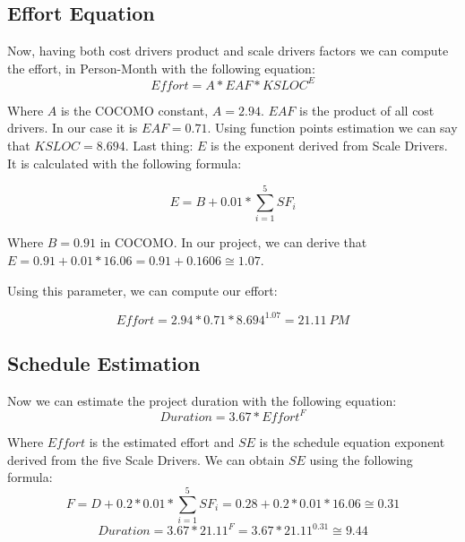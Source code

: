 \pagebreak
\subsection{Effort Equation} %
\label{sub:effort_equation}

Now, having both cost drivers product and scale drivers factors we can compute
the effort, in Person-Month with the following equation:
$$ Effort = A * EAF * KSLOC^E $$

Where $A$ is the COCOMO constant, $ A = 2.94 $. $EAF$ is the product of
all cost drivers. In our case it is $ EAF = 0.71 $. Using function points estimation
we can say that $ KSLOC = 8.694 $.
Last thing: $E$ is the exponent derived from Scale Drivers. It is calculated with
the following formula:

$$ E = B + 0.01 * \sum_{i=1}^5 SF_i $$

Where $ B = 0.91 $ in COCOMO.
In our project, we can derive that $ E = 0.91 + 0.01 * 16.06 = 0.91 + 0.1606 \cong 1.07 $.

Using this parameter, we can compute our effort:

$$ Effort = 2.94 * 0.71 * 8.694^{1.07} = 21.11~PM $$

\subsection{Schedule Estimation}
\label{sub:schedule_estimation}

Now we can estimate the project duration with the following equation:
$$ Duration = 3.67 * Effort^F $$

Where $Effort$ is the estimated effort and $SE$ is the schedule equation exponent derived
from the five Scale Drivers.
We can obtain $SE$ using the following formula:
$$ F = D + 0.2 * 0.01 * \sum_{i=1}^5 SF_i = 0.28 + 0.2 * 0.01 * 16.06 \cong 0.31 $$
$$ Duration = 3.67 * 21.11^F = 3.67 * 21.11^{0.31} \cong 9.44 $$

